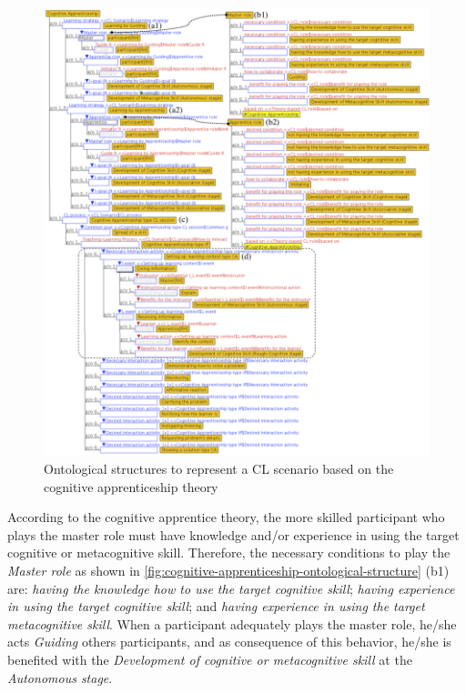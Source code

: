\begin{figure}[!htbp]
 \caption{Ontological structures to represent a CL scenario based on the cognitive apprenticeship theory}
 \label{fig:cognitive-apprenticeship-ontological-structure}
 \centering
 \includegraphics[width=1\textwidth]{images/chap-ontogacles1/cognitive-apprenticeship-ontological-structure.png}
 \fautor
\end{figure}

According to the cognitive apprentice theory, the more skilled participant who plays the master role must have knowledge and/or experience in using the target cognitive or metacognitive skill.
Therefore, the necessary conditions to play the \emph{Master role} as shown in \autoref{fig:cognitive-apprenticeship-ontological-structure} (b1) are:
\emph{having the knowledge how to use the target cognitive skill};
\emph{having experience in using the target cognitive skill}; and
\emph{having experience in using the target metacognitive skill}.
When a participant adequately plays the master role, he/she acts \emph{Guiding} others participants, and as consequence of this behavior, he/she is benefited with the \emph{Development of cognitive or metacognitive skill} at the \emph{Autonomous stage}.

